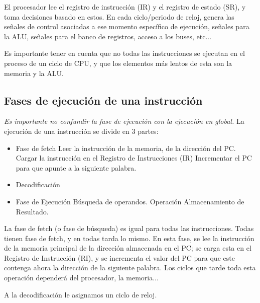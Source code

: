 \documentclass[a4paper,11pt,spanish]{report}
\begin{document}
El procesador lee el registro de instrucción (IR) y el registro de estado (SR), y toma decisiones basado en estos. En cada ciclo/periodo de reloj, genera las señales de control asociadas a ese momento específico de ejecución, señales para la ALU, señales para el banco de registros, acceso a los buses, etc...

Es importante tener en cuenta que no todas las instrucciones se ejecutan en el proceso de un ciclo de CPU, y que los elementos más lentos de esta son la memoria y la ALU.

\subsection{Fases de ejecución de una instrucción}
\emph{Es importante no confundir la fase de ejecución con la ejecución en global.}
La ejecución de una instrucción se divide en 3 partes:

\begin{itemize}
\item Fase de fetch
\subitem Leer la instrucción de la memoria, de la dirección del PC.
\subitem Cargar la instrucción en el Registro de Instrucciones (IR)
\subitem Incrementar el PC para que apunte a la siguiente palabra.
\item Decodificación
\item Fase de Ejecución
\subitem Búsqueda de operandos.
\subitem Operación
\subitem Almacenamiento de Resultado.
\end{itemize}

La fase de fetch (o fase de búsqueda) es igual para todas las instrucciones. Todas tienen fase de fetch, y en todas tarda lo mismo. En esta fase, se lee la instrucción de la memoria principal de la dirección almacenada en el PC; se carga esta en el Registro de Instrucción (RI), y se incrementa el valor del PC para que este contenga ahora la dirección de la siguiente palabra. Los ciclos que tarde toda esta operación dependerá del procesador, la memoria...

A la decodificación le asignamos un ciclo de reloj.
\end{document}
